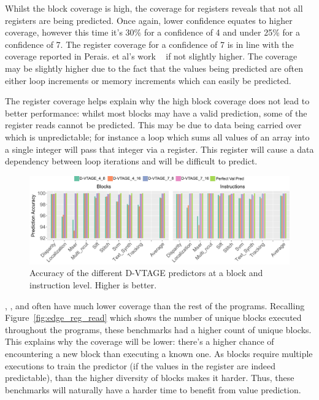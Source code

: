 Whilst the block coverage is high, the coverage for registers reveals that not all registers are being predicted.
Once again, lower confidence equates to higher coverage, however this time it's 30\% for a confidence of 4 and under 25\% for a confidence of 7.
The register coverage for a confidence of 7 is in line with the coverage reported in Perais. et al's work ~\cite{peraisBeBop2015, peraisVTAGE2014} if not slightly higher.
The coverage may be slightly higher due to the fact that the values being predicted are often either loop increments or memory increments which can easily be predicted.

The register coverage helps explain why the high block coverage does not lead to better performance: whilst most blocks may have a valid prediction, some of the register reads cannot be predicted.
This may be due to data being carried over which is unpredictable; for instance a loop which sums all values of an array into a single integer will pass that integer via a register.
This register will cause a data dependency between loop iterations and will be difficult to predict.

\begin{figure}[t]
    \centering
    \includegraphics[width=1\textwidth]{chapter3/graphics/predAcc.pdf}
    \caption{Accuracy of the different D-VTAGE predictors at a block and instruction level. Higher is better.}
    \label{fig:vtag_accuracy_block}
\end{figure}

, ,  and  often have much lower coverage than the rest of the programs.
Recalling Figure~\ref{fig:edge_reg_read} which shows the number of unique blocks executed throughout the programs, these benchmarks had a higher count of unique blocks.
This explains why the coverage will be lower: there's a higher chance of encountering a new block than executing a known one.
As blocks require multiple executions to train the predictor (if the values in the register are indeed predictable), than the higher diversity of blocks makes it harder.
Thus, these benchmarks will naturally have a harder time to benefit from value prediction.

